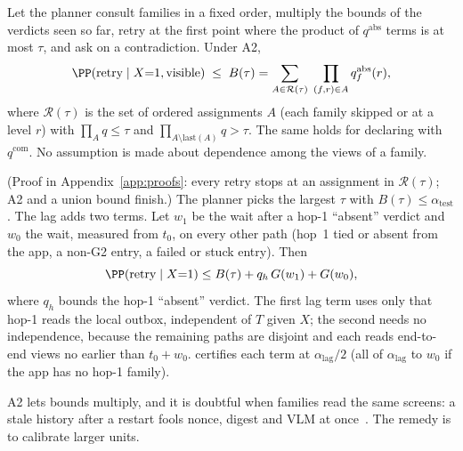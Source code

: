 \begin{proposition}
\label{prop:family}
Let the planner consult families in a fixed order, multiply the bounds of the verdicts seen so far, retry at the first point where the product of
$q^{\mathrm{abs}}$ terms is at most $\tau$, and ask on a contradiction. Under A2,
\[
\PP(\text{retry}\mid X{=}1,\text{visible})\;\le\;B(\tau)=\sum_{A\in\mathcal R(\tau)}\;\prod_{(f,r)\in A}q^{\mathrm{abs}}_f(r),
\]
where $\mathcal R(\tau)$ is the set of ordered assignments $A$ (each family skipped or at a level $r$) with $\prod_A q\le\tau$ and $\prod_{A\setminus\mathrm{last}(A)}q>\tau$.
The same holds for declaring with $q^{\mathrm{com}}$. No assumption is made about dependence among the views of a family.
\end{proposition}
(Proof in Appendix~\ref{app:proofs}: every retry stops at an assignment in $\mathcal R(\tau)$; A2 and a union bound finish.)
The planner picks the largest $\tau$ with $B(\tau)\le\alpha_{\mathrm{test}}$. The lag adds two terms. Let $w_1$ be the wait after a hop-1 ``absent'' verdict and $w_0$ the
wait, measured from $t_0$, on every other path (hop~1 tied or absent from the app, a non-G2 entry, a failed or stuck entry). Then
\begin{equation}
\PP(\text{retry}\mid X{=}1)\le B(\tau)+q_h\,G(w_1)+G(w_0),
\label{eq:lagsplit}
\end{equation}
where $q_h$ bounds the hop-1 ``absent'' verdict. The first lag term uses only that hop-1 reads the local outbox, independent of $T$ given $X$; the second needs no
independence, because the remaining paths are disjoint and each reads end-to-end views no earlier than $t_0+w_0$. \alg certifies each term at $\alpha_{\mathrm{lag}}/2$ (all of
$\alpha_{\mathrm{lag}}$ to $w_0$ if the app has no hop-1 family).

 A2 lets bounds multiply, and it is doubtful when families read the same screens: a stale history after a restart fools nonce, digest and VLM at
once~\cite{zheng2026vpcontrol}. The remedy is to calibrate larger units.

